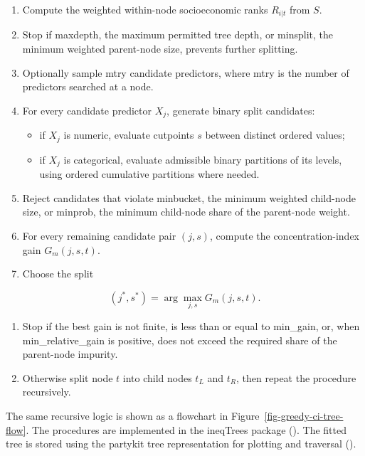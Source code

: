 \documentclass[
  11pt,
  a4paper,
]{article}
\providecommand{\tightlist}{%
  \setlength{\itemsep}{0pt}\setlength{\parskip}{0pt}}
\begin{document}
\begin{enumerate}
\def\labelenumi{\arabic{enumi}.}
\tightlist
\item
  Compute the weighted within-node socioeconomic ranks \(R_{i|t}\) from
  \(S\).
\item
  Stop if maxdepth, the maximum permitted tree depth, or minsplit, the
  minimum weighted parent-node size, prevents further splitting.
\item
  Optionally sample mtry candidate predictors, where mtry is the number
  of predictors searched at a node.
\item
  For every candidate predictor \(X_j\), generate binary split
  candidates:

  \begin{itemize}
  \tightlist
  \item
    if \(X_j\) is numeric, evaluate cutpoints \(s\) between distinct
    ordered values;
  \item
    if \(X_j\) is categorical, evaluate admissible binary partitions of
    its levels, using ordered cumulative partitions where needed.
  \end{itemize}
\item
  Reject candidates that violate minbucket, the minimum weighted
  child-node size, or minprob, the minimum child-node share of the
  parent-node weight.
\item
  For every remaining candidate pair \((j,s)\), compute the
  concentration-index gain \(G_m(j,s,t)\).
\item
  Choose the split
\end{enumerate}

\[
(j^*,s^*) = \arg\max_{j,s} G_m(j,s,t).
\]

\begin{enumerate}
\def\labelenumi{\arabic{enumi}.}
\setcounter{enumi}{7}
\tightlist
\item
  Stop if the best gain is not finite, is less than or equal to
  min\_gain, or, when min\_relative\_gain is positive, does not exceed
  the required share of the parent-node impurity.
\item
  Otherwise split node \(t\) into child nodes \(t_L\) and \(t_R\), then
  repeat the procedure recursively.
\end{enumerate}

The same recursive logic is shown as a flowchart in
Figure~\ref{fig-greedy-ci-tree-flow}. The procedures are implemented in
the ineqTrees package (). The
fitted tree is stored using the partykit tree representation for
plotting and traversal ().
\end{document}
